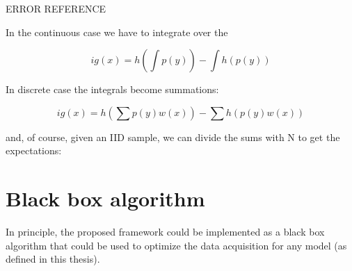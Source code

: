 ERROR REFERENCE

In the continuous case we have to integrate over the 

\begin{equation}
ig(x) = h \left(\int p(y) \right)  - \int h \left( p(y) \right) 
\end{equation}

In discrete case the integrals become summations:

\begin{equation}
	ig(x) = h \left(\sum p(y) w(x)\right)  - \sum h \left(p(y)w(x)\right) 
\end{equation}

and, of course, given an IID sample, we can divide the sums with N to get the expectations:


\section{Black box algorithm}

In principle, the proposed framework could be implemented as a black box algorithm that could be used to optimize the data acquisition for any model (as defined in this thesis).